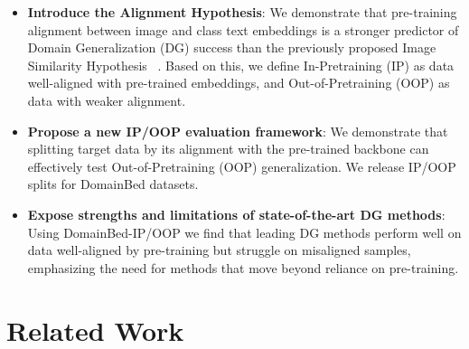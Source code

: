 \documentclass{article} %
\begin{document}
\begin{itemize}[noitemsep, topsep=0pt]
    \item \textbf{Introduce the Alignment Hypothesis}: We demonstrate that pre-training alignment between image and class text embeddings is a stronger predictor of Domain Generalization (DG) success than the previously proposed Image Similarity Hypothesis ~\citep{mayilvahanan2024does}. Based on this, we define In-Pretraining (IP) as data well-aligned with pre-trained embeddings, and Out-of-Pretraining (OOP) as data with weaker alignment.
    \item \textbf{Propose a new IP/OOP evaluation framework}: We demonstrate that splitting target data by its alignment with the pre-trained backbone can effectively test Out-of-Pretraining (OOP) generalization. We release IP/OOP splits for DomainBed datasets.
    \item \textbf{Expose strengths and limitations of state-of-the-art DG methods}: Using DomainBed-IP/OOP we find that leading DG methods perform well on data well-aligned by pre-training but struggle on misaligned samples, emphasizing the need for methods that move beyond reliance on pre-training.
\end{itemize}






\section{Related Work}
\end{document}
